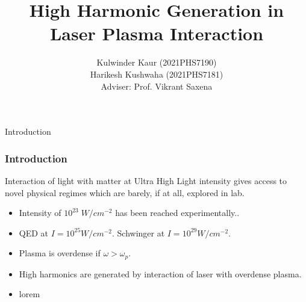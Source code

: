 \documentclass{beamer}
\title[High Harmonic Generation]{High Harmonic Generation in Laser Plasma Interaction}
\date{}
\institute[IIT Delhi]{\large Indian Institute of Technology, Delhi}
\author[]{Kulwinder Kaur (2021PHS7190)\\ Harikesh Kushwaha (2021PHS7181)\\[3mm]Adviser: Prof. Vikrant Saxena}
\begin{document}
\maketitle
\begin{frame}{Introduction}
    \frametitle{Introduction}
    \small
    Interaction of light with matter at Ultra High Light intensity gives access to novel physical regimes which are barely, if at all, explored in lab.\footnotemark
    \begin{itemize}
        \item Intensity of $10^{23} \; W/cm^{-2}$ has been reached experimentally.\footnotemark.
        \item QED at $I = 10^{25}W/cm^{-2}$. Schwinger at $I = 10^{29}W/cm^{-2}$.
        \item Plasma is overdense if $\omega>\omega_p$.
        \item High harmonics are generated by interaction of laser with overdense plasma.
    \end{itemize}
    \begin{minipage}[t]{0.48\linewidth}
        \begin{itemize}
            \item lorem
        \end{itemize}
    \end{minipage}
    \begin{minipage}[t]{0.49\linewidth}
        \begin{figure}
            \centering

\end{figure}
\end{minipage}
\end{frame}
\end{document}
